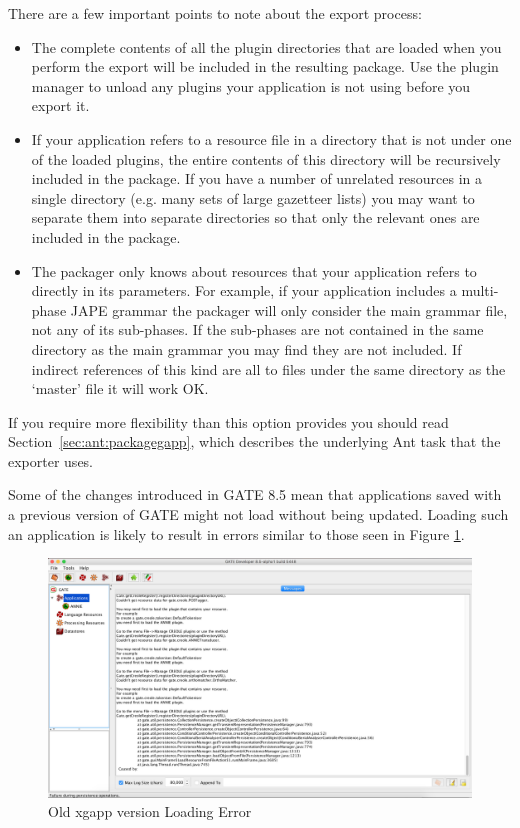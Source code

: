 There are a few important points to note about the export process:
\begin{itemize}
\item The complete contents of all the plugin directories that are loaded when
  you perform the export will be included in the resulting package.  Use the
  plugin manager to unload any plugins your application is not using before you
  export it.
\item If your application refers to a resource file in a directory that is not
  under one of the loaded plugins, the entire contents of this directory will be
  recursively included in the package.  If you have a number of unrelated
  resources in a single directory (e.g. many sets of large gazetteer lists) you
  may want to separate them into separate directories so that only the relevant
  ones are included in the package.
\item The packager only knows about resources that your application refers to
  directly in its parameters.  For example, if your application includes a
  multi-phase JAPE grammar the packager will only consider the main grammar
  file, not any of its sub-phases.  If the sub-phases are not contained in the
  same directory as the main grammar you may find they are not included.  If
  indirect references of this kind are all to files under the same directory as
  the `master' file it will work OK.
\end{itemize}

If you require more flexibility than this option provides you should read
Section~\ref{sec:ant:packagegapp}, which describes the underlying Ant task that
the exporter uses.

Some of the changes introduced in GATE 8.5 mean that applications saved with a previous version of GATE might not
load without being updated. Loading such an application is likely to result in errors similar to those seen in Figure \ref{fig:oldxgapp}.

\begin{figure}[htb]
\begin{center}
\includegraphics[width=\textwidth]{old-xgapp-error.png}
\end{center}
\caption{Old xgapp version Loading Error}
\label{fig:oldxgapp}
\end{figure}

